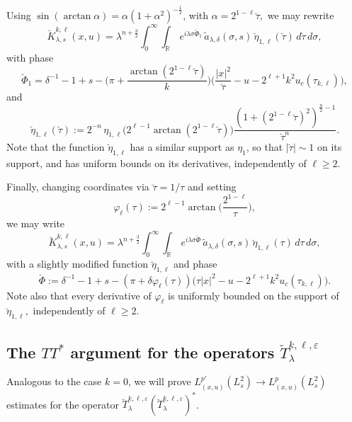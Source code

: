 \documentclass[leqno]{amsart}
\theoremstyle{definition}
\theoremstyle{remark}
\numberwithin{equation}{section}
\newcommand{\R}{\mathbb{R}}
\newcommand\la{{\lambda}}
\newcommand\de{{\delta}}
\begin{document}
Using ${\sin(\arctan \alpha) = \alpha (1 + \alpha^2)^{-\frac 12}}$, with $\alpha=2^{1-\ell} {\breve\tau},$ we may rewrite 
\[
\breve K_{\lambda,s}^{k,\ell}(x,u) = \lambda^{n + \frac 32} \int_0^\infty \int_\R \, e^{i \lambda \sigma \breve \Phi_1} \,\tilde a_{\la,\de}(\sigma,s) \, \breve\eta_{1,\ell} (\breve \tau)   \, d  \breve\tau \, d\sigma,
\]
with phase 
\[
\breve \Phi_1 =\delta^{-1}-1+s -\Big(\pi + \frac{\arctan(2^{1-\ell} \breve \tau)}{k} \Big) \Big(\frac{| x|^2}{{\breve\tau}} - u  -2^{\ell+1} k^2 u_c(\tau_{k,\ell})\Big),
\]
and 
\[
\breve\eta_{1,\ell} (\breve\tau):=2^{-n}\, \eta_{1,\ell}\big(2^{\ell-1} \arctan(2^{1-\ell} \breve \tau)\big) \frac {(1 + (2^{1-\ell} {\breve\tau})^2)^{\frac n 2 -1}}{\breve \tau^n}.
\]
Note that the function $\breve\eta_{1,\ell}$ has a similar support as $\eta_1$, so that $|\breve\tau|\sim 1$ on its support, and has uniform bounds on its derivatives, independently of $\ell\ge 2$.

Finally, changing coordinates via ${\breve\tau}=1/\tau$ and setting
\[
 \varphi_\ell(\tau) := 2^{\ell-1} \arctan\Big(\frac{2^{1-\ell}}{ \tau}\Big),
\] 
we may write 
\begin{equation}\label{eq:kernel-bar-5}
\breve K_{\lambda,s}^{k,\ell}(x,u) = \lambda^{n + \frac 32} \int_0^\infty \int_\R \, e^{i \lambda \sigma \breve \Phi} \,\tilde a_{\la,\de}(\sigma,s) \, \breve\eta_{1,\ell} (\tau)   \, d  \tau \, d\sigma,
\end{equation}
with a slightly modified function $\breve\eta_{1,\ell} $ and phase 
\begin{equation}\label{eq:Phi-breve}
\breve \Phi := \delta^{-1}-1 + s - (\pi + \delta  \varphi_\ell(\tau)) \big( {\tau}|x|^2  - u-2^{\ell+1} k^2 u_c(\tau_{k,\ell})\big).
\end{equation}
Note also that every derivative of $\varphi_\ell$ is uniformly bounded on the support of $\breve\eta_{1,\ell},$ independently of $\ell\ge 2$.


\subsection{The $TT^*$ argument for the operators $\breve T^{k,\ell,\varepsilon}_\lambda$}\label{TT*}

Analogous to the case $k=0$, we will prove $L_{(x,u)}^{p'}(L_s^2) \to L_{(x,u)}^{p}(L_s^2)$ estimates for the operator $\breve T^{k,\ell,\varepsilon}_\lambda (\breve T^{k,\ell,\varepsilon}_\lambda)^*$.
\end{document}

